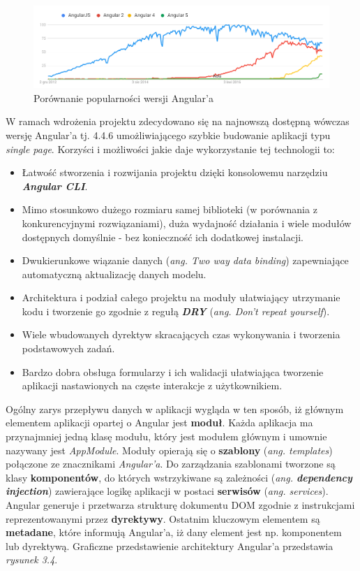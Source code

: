 \begin{figure}[ht]
	\centering
	\includegraphics[width=1\linewidth]{graphics/angular-frameworks.png}
	\caption{Porównanie popularności wersji Angular'a}
	\label{fig:angular-version-comparison}
\end{figure}

W ramach wdrożenia projektu zdecydowano się na najnowszą dostępną wówczas wersję Angular'a tj. 4.4.6 umożliwiającego szybkie budowanie aplikacji typu \textit{single page}. Korzyści i możliwości jakie daje wykorzystanie tej technologii to:
\begin{itemize}
    \item Łatwość stworzenia i rozwijania projektu dzięki konsolowemu narzędziu \textbf{\textit{Angular CLI}}.
    \item Mimo stosunkowo dużego rozmiaru samej biblioteki (w porównania z konkurencyjnymi rozwiązaniami), duża wydajność działania i wiele modułów dostępnych domyślnie - bez konieczność ich dodatkowej instalacji.
    \item Dwukierunkowe wiązanie danych (\textit{ang. Two way data binding}) zapewniające automatyczną aktualizację danych modelu.
    \item Architektura i podział całego projektu na moduły ułatwiający utrzymanie kodu i tworzenie go zgodnie z regułą \textbf{\textit{DRY}} (\textit{ang. Don't repeat yourself}).
    \item Wiele wbudowanych dyrektyw skracających czas wykonywania i tworzenia podstawowych zadań.
    \item Bardzo dobra obsługa formularzy i ich walidacji ułatwiająca tworzenie aplikacji nastawionych na częste interakcje z użytkownikiem.
\end{itemize}
Ogólny zarys przepływu danych w aplikacji wygląda w ten sposób, iż głównym elementem aplikacji opartej o Angular jest \textbf{moduł}. Każda aplikacja ma przynajmniej jedną klasę modułu, który jest modułem głównym i umownie nazywany jest \textit{AppModule}. Moduły opierają się o \textbf{szablony} (\textit{ang. templates}) połączone ze znacznikami \textit{Angular'a}. Do zarządzania szablonami tworzone są klasy \textbf{komponentów}, do których wstrzykiwane są zależności (\textit{ang. \textbf{dependency injection}}) zawierające logikę aplikacji w postaci \textbf{serwisów} (\textit{ang. services}). Angular generuje i przetwarza strukturę dokumentu DOM zgodnie z instrukcjami reprezentowanymi przez \textbf{dyrektywy}.  Ostatnim kluczowym elementem są \textbf{metadane}, które informują Angular'a, iż dany element jest np. komponentem lub dyrektywą. Graficzne przedstawienie architektury Angular'a przedstawia \textit{rysunek 3.4}.

